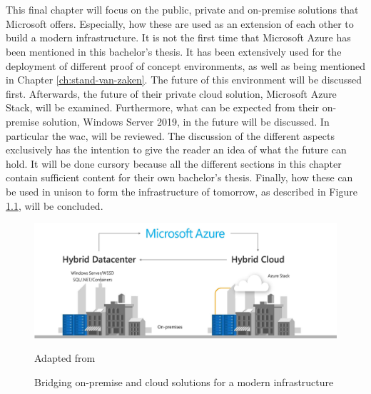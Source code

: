 \chapter{}
\label{ch:toekomstvisie}
This final chapter will focus on the public, private and on-premise solutions that Microsoft offers. 
Especially, how these are used as an extension of each other to build a modern infrastructure. 
It is not the first time that Microsoft Azure has been mentioned in this bachelor's thesis. 
It has been extensively used for the deployment of different proof of concept environments, as well as being mentioned in Chapter \ref{ch:stand-van-zaken}. 
The future of this environment will be discussed first. 
Afterwards, the future of their private cloud solution, Microsoft Azure Stack, will be examined. 
Furthermore, what can be expected from their on-premise solution, Windows Server 2019, in the future will be discussed. 
In particular the \acrlong{wac}, will be reviewed. 
The discussion of the different aspects exclusively has the intention to give the reader an idea of what the future can hold. 
It will be done cursory because all the different sections in this chapter contain sufficient content for their own bachelor's thesis. 
Finally, how these can be used in unison to form the infrastructure of tomorrow, as described in Figure \ref{fig:Azure_FullCircle}, will be concluded.

\begin{figure}[h]
	\captionsetup{width=0.7\linewidth}
	\includegraphics[width=0.8\linewidth]{img/Toekomstvisie/Azure1.png}
	\centering
	\caption[Modern infrastructure]{Bridging on-premise and cloud solutions for a modern infrastructure}
	\scriptsize	
	Adapted from \cite{Singh2019}
	\label{fig:Azure_FullCircle}
\end{figure}

\clearpage

